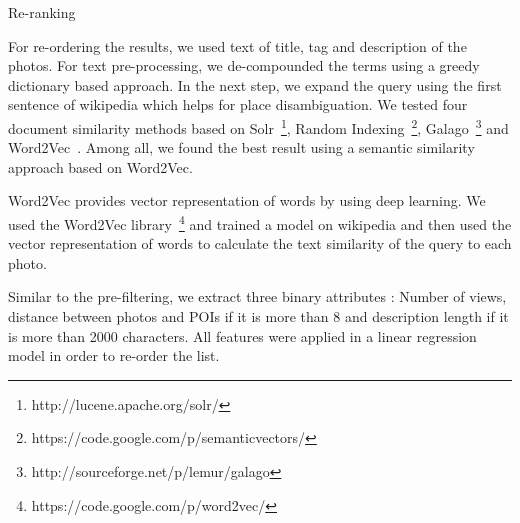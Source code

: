 \begin{subsection}{Re-ranking}

For re-ordering the results, we used text of title, tag and description of the photos. For text pre-processing, we de-compounded the terms using a greedy dictionary based approach. In the next step, we expand the query using the first sentence of wikipedia which helps for place disambiguation. We tested four document similarity methods based on Solr~\footnote{http://lucene.apache.org/solr/}, Random Indexing~\footnote{https://code.google.com/p/semanticvectors/}, Galago~\footnote{http://sourceforge.net/p/lemur/galago} and Word2Vec~\cite{word2vec}. Among all, we found the best result using a semantic similarity approach based on Word2Vec.

Word2Vec provides vector representation of words by using deep learning. We used the Word2Vec library~\footnote{https://code.google.com/p/word2vec/} and trained a model on wikipedia and then used the vector representation of words to calculate the text similarity of the query to each photo.

Similar to the pre-filtering, we extract three binary attributes : Number of views, distance between photos and POIs if it is more than 8 and description length if it is more than 2000 characters. All features were applied in a linear regression model in order to re-order the list.

\end{subsection}



